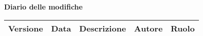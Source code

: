 \documentclass[GlossarioEST.tex]{subfiles}
\begin{document}
\huge \bfseries Diario delle modifiche\\
\begin{table}[htbp]
	\centering
	\renewcommand\arraystretch{1.2}

	\begin{tabularx}{\textwidth}{p{2cm}|p{2cm}|p{3cm}|p{2cm}|p{3cm}}
		\hline
		\textbf{Versione} & \textbf{Data} & \textbf{Descrizione} & \textbf{Autore} & \textbf{Ruolo}\\
		\hline
	
	\end{tabularx}

\end{table}
\end{document}
